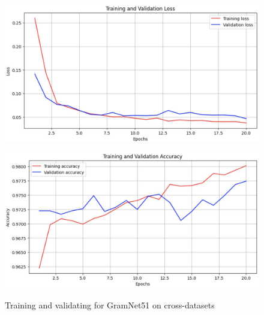 \documentclass[final]{cvpr}
\begin{document}
\begin{figure}[t]
\centering
\begin{minipage}{0.45\linewidth}
   \includegraphics[width=\linewidth]{images/gramnet51_cd_loss.jpg}
   \label{fig:image1}
\end{minipage}
\hfill
\begin{minipage}{0.45\linewidth}
   \includegraphics[width=\linewidth]{images/gramnet51_cd_acc.jpg}
   \label{fig:image2}
\end{minipage}
\caption{Training and validating for GramNet51 on cross-datasets}
\label{fig:gramnet51_cd}
\end{figure}

\end{document}
